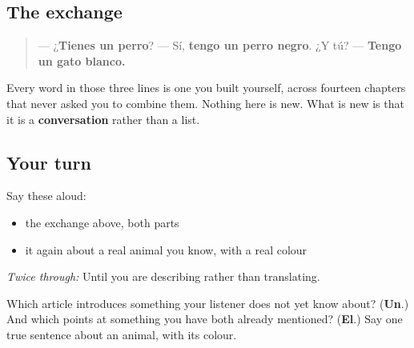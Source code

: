 \subsection*{The exchange}
\begin{quote}
— ¿\textbf{Tienes un perro}? — Sí, \textbf{tengo un perro negro}. ¿Y tú? — \textbf{Tengo un gato blanco.}
\end{quote}

Every word in those three lines is one you built yourself, across fourteen chapters that never asked you to combine them. Nothing here is new. What is new is that it is a \textbf{conversation} rather than a list.

\subsection*{Your turn}
Say these aloud:

\begin{itemize}
\raggedright
  \item the exchange above, both parts
  \item it again about a real animal you know, with a real colour
\end{itemize}

\emph{Twice through:} Until you are describing rather than translating.

\begin{tcolorbox}[breakable,colback=teal!4,colframe=teal!35!black,title={Before you move on}]
Which article introduces something your listener does not yet know about? (\textbf{Un}.) And which points at something you have both already mentioned? (\textbf{El}.) Say one true sentence about an animal, with its colour.
\end{tcolorbox}

